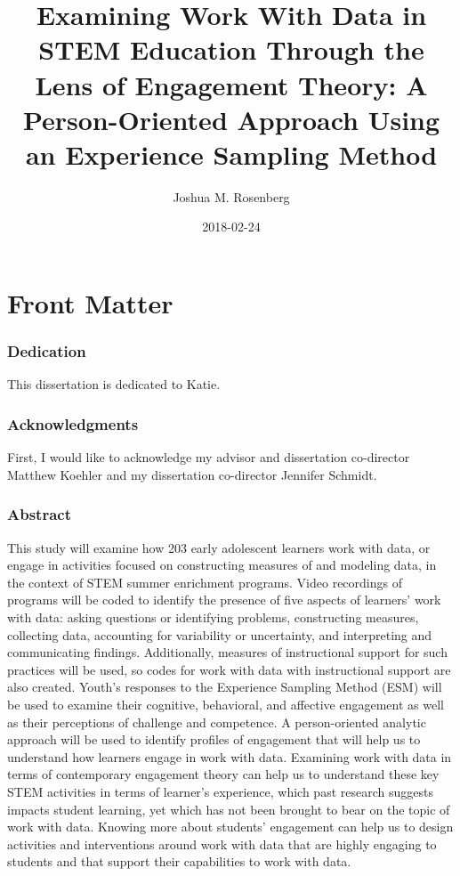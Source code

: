 \documentclass[]{msu-thesis}
\title{Examining Work With Data in STEM Education Through the Lens of
Engagement Theory: A Person-Oriented Approach Using an Experience
Sampling Method}
\author{Joshua M. Rosenberg}
\date{2018-02-24}
\theoremstyle{definition}
\theoremstyle{definition}
\theoremstyle{definition}
\theoremstyle{remark}
\begin{document}
\maketitle

{
\setcounter{tocdepth}{2}
\tableofcontents
}
\section{Front Matter}\label{front-matter}

\subsubsection{Dedication}\label{dedication}

This dissertation is dedicated to Katie.

\subsubsection{Acknowledgments}\label{acknowledgments}

First, I would like to acknowledge my advisor and dissertation
co-director Matthew Koehler and my dissertation co-director Jennifer
Schmidt.

\subsubsection{Abstract}\label{abstract}

This study will examine how 203 early adolescent learners work with
data, or engage in activities focused on constructing measures of and
modeling data, in the context of STEM summer enrichment programs. Video
recordings of programs will be coded to identify the presence of five
aspects of learners' work with data: asking questions or identifying
problems, constructing measures, collecting data, accounting for
variability or uncertainty, and interpreting and communicating findings.
Additionally, measures of instructional support for such practices will
be used, so codes for work with data with instructional support are also
created. Youth's responses to the Experience Sampling Method (ESM) will
be used to examine their cognitive, behavioral, and affective engagement
as well as their perceptions of challenge and competence. A
person-oriented analytic approach will be used to identify profiles of
engagement that will help us to understand how learners engage in work
with data. Examining work with data in terms of contemporary engagement
theory can help us to understand these key STEM activities in terms of
learner's experience, which past research suggests impacts student
learning, yet which has not been brought to bear on the topic of work
with data. Knowing more about students' engagement can help us to design
activities and interventions around work with data that are highly
engaging to students and that support their capabilities to work with
data.
\end{document}
